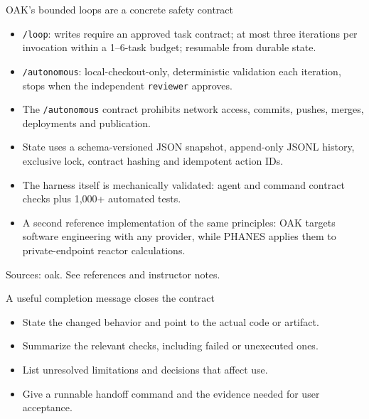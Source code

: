 \documentclass[aspectratio=169,11pt]{beamer}
\begin{document}
\begin{frame}[t,fragile]{OAK's bounded loops are a concrete safety contract}
\fontsize{11.5}{14}\selectfont
\begin{itemize}\setlength{\itemsep}{2mm}
\item \texttt{/loop}: writes require an approved task contract; at most three iterations per invocation within a 1--6-task budget; resumable from durable state.
\item \texttt{/autonomous}: local-checkout-only, deterministic validation each iteration, stops when the independent \texttt{reviewer} approves.
\item The \texttt{/autonomous} contract prohibits network access, commits, pushes, merges, deployments and publication.
\item State uses a schema-versioned JSON snapshot, append-only JSONL history, exclusive lock, contract hashing and idempotent action IDs.
\item The harness itself is mechanically validated: agent and command contract checks plus 1{,}000+ automated tests.
\end{itemize}
\fontsize{10.5}{12.5}\selectfont
\begin{itemize}\setlength{\itemsep}{1mm}
\item A second reference implementation of the same principles: OAK targets software engineering with any provider, while PHANES applies them to private-endpoint reactor calculations.
\end{itemize}
\vfill{\fontsize{6.5}{8}\selectfont\color{UTgray} Sources: oak. See references and instructor notes.\par}
\end{frame}
\begin{frame}[t,fragile]{A useful completion message closes the contract}
\fontsize{11.5}{14}\selectfont
\begin{itemize}\setlength{\itemsep}{2mm}
\item State the changed behavior and point to the actual code or artifact.
\item Summarize the relevant checks, including failed or unexecuted ones.
\item List unresolved limitations and decisions that affect use.
\item Give a runnable handoff command and the evidence needed for user acceptance.
\end{itemize}
\end{frame}
\end{document}
